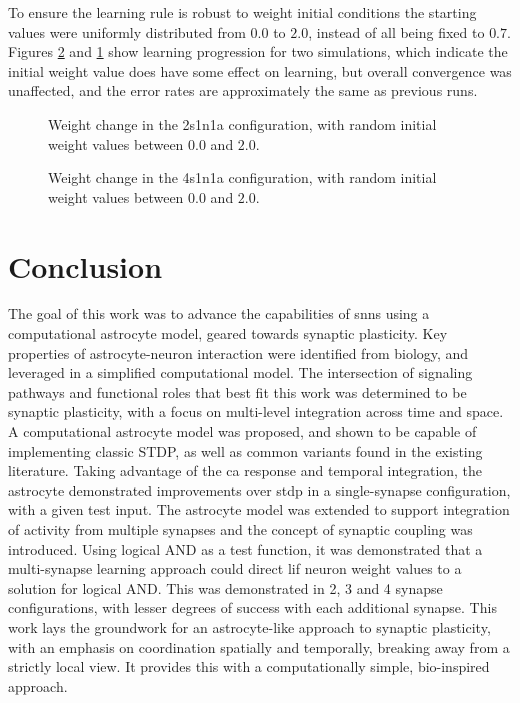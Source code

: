 \documentclass[conference]{IEEEtran}
\newcommand{\ca}{\gls{ca}\textrm{ }}
\newcommand{\asvgf}[4]{
	\begin{figure}[!htbp]
    	\centering
		\adjustbox{max width=#4\linewidth}{}
        \caption{#2.}
        \label{#3}
	\end{figure}
}
\begin{document}
To ensure the learning rule is robust to weight initial conditions the starting
values were uniformly distributed from $0.0$ to $2.0$, instead of all being
fixed to $0.7$. Figures \ref{fig:snn_4s1a_and_w_dw_w} and
\ref{fig:snn_2s1a_and_w_dw_w} show learning progression for two simulations,
which indicate the initial weight value does have some effect on learning, but
overall convergence was unaffected, and the error rates are approximately the
same as previous runs.

\asvgf{figures/artifacts/obj3/snn_2s1a_and_w.svg}{Weight change in the 2s1n1a
  configuration, with random initial weight values between $0.0$ and
  $2.0$}{fig:snn_2s1a_and_w_dw_w}{1.0}

\asvgf{figures/artifacts/obj3/snn_4s1a_and_w.svg}{Weight change in the 4s1n1a
  configuration, with random initial weight values between $0.0$ and
  $2.0$}{fig:snn_4s1a_and_w_dw_w}{1.0}


\section{Conclusion} \label{section:conclusion}
The goal of this work was to advance the capabilities of \glspl{snn} using a
computational astrocyte model, geared towards synaptic plasticity. Key
properties of astrocyte-neuron interaction were identified from biology, and
leveraged in a simplified computational model. The intersection of signaling
pathways and functional roles that best fit this work was determined to be
synaptic plasticity, with a focus on multi-level integration across time and
space. A computational astrocyte model was proposed, and shown to be capable of
implementing classic STDP, as well as common variants found in the existing
literature. Taking advantage of the \ca response and temporal integration, the
astrocyte demonstrated improvements over \gls{stdp} in a single-synapse
configuration, with a given test input. The astrocyte model was extended to
support integration of activity from multiple synapses and the concept of
synaptic coupling was introduced. Using logical AND as a test function, it was
demonstrated that a multi-synapse learning approach could direct \gls{lif}
neuron weight values to a solution for logical AND. This was demonstrated in 2,
3 and 4 synapse configurations, with lesser degrees of success with each
additional synapse. This work lays the groundwork for an astrocyte-like approach
to synaptic plasticity, with an emphasis on coordination spatially and
temporally, breaking away from a strictly local view. It provides this with a
computationally simple, bio-inspired approach.



\renewcommand*{\bibfont}{\small}

\printbibliography[heading=bibintoc]
\end{document}
